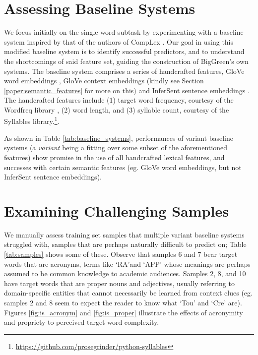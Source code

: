 \documentclass{dcthesis}
\theoremstyle{definition}
\theoremstyle{remark}
\begin{document}
\section{Assessing Baseline Systems}

We focus initially on the single word subtask by experimenting with a baseline system inspired by that of the authors of CompLex \citep{shardlow2020complex}. Our goal in using this modified baseline system is to identify successful predictors, and to understand the shortcomings of said feature set, guiding the construction of BigGreen's own systems. The baseline system comprises a series of handcrafted features, GloVe word embeddings \citep{pennington2014glove}, GloVe context embeddings (kindly see Section \ref{paper:semantic_features} for more on this) and InferSent sentence embeddings \citep{conneau-EtAl:2017:EMNLP2017}. The handcrafted features include (1) target word frequency, courtesy of the Wordfreq library \citep{robyn_speer_2018_1443582}, (2) word length, and (3) syllable count, courtesy of the Syllables library.\footnote{\url{https://github.com/prosegrinder/python-syllables}}. 

As shown in Table \ref{tab:baseline_systems}, performances of variant baseline systems (a \textit{variant} being a fitting over some subset of the aforementioned features) show promise in the use of all handcrafted lexical features, and successes with certain semantic features (eg. GloVe word embeddings, but not InferSent sentence embeddings). 

\section{Examining Challenging Samples}

We manually assess training set samples that multiple variant baseline systems struggled with, samples that are perhaps naturally difficult to predict on; Table \ref{tab:samples} shows some of these. Observe that samples 6 and 7 bear target words that are acronyms, terms like \lq{RA}\rq and \lq{APP}\rq{} whose meanings are perhaps assumed to be common knowledge to academic audiences. Samples 2, 8, and 10 have target words that are proper nouns and adjectives, usually referring to domain-specific entities that cannot necessarily be learned from context clues (eg. samples 2 and 8 seem to expect the reader to know what \lq{Tou}\rq{} and \lq{Cre}\rq{} are). Figures \ref{fig:is_acronym} and \ref{fig:is_proper} illustrate the effects of acronymity and propriety to perceived target word complexity.
\end{document}
